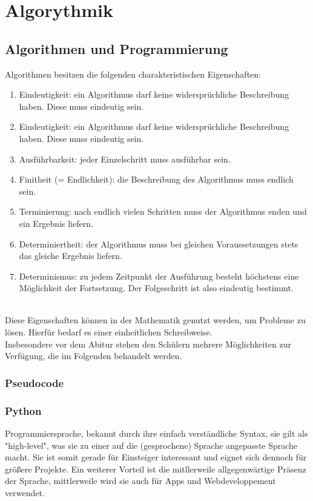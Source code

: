 \chapter{Algorythmik}
\section{Algorithmen und Programmierung}
\begin{Definition}
	Algorithmen besitzen die folgenden charakteristischen Eigenschaften:
	\begin{enumerate}
		\item Eindeutigkeit: ein Algorithmus darf keine widersprüchliche Beschreibung haben. Diese muss eindeutig sein.
		\item Eindeutigkeit: ein Algorithmus darf keine widersprüchliche Beschreibung haben. Diese muss eindeutig sein.
		\item Ausführbarkeit: jeder Einzelschritt muss ausführbar sein.
		\item Finitheit (= Endlichkeit): die Beschreibung des Algorithmus muss endlich sein.
		\item Terminierung: nach endlich vielen Schritten muss der Algorithmus enden und ein Ergebnis liefern.
		\item Determiniertheit: der Algorithmus muss bei gleichen Voraussetzungen stets das gleiche Ergebnis liefern.
		\item   Determinismus: zu jedem Zeitpunkt der Ausführung besteht höchstens eine Möglichkeit der Fortsetzung. Der Folgeschritt ist also eindeutig bestimmt.
	\end{enumerate}
\end{Definition}
\\
Diese Eigenschaften können in der Mathematik genutzt werden, um Probleme zu lösen. Hierfür bedarf es einer einheitlichen Schreibweise.\\
Insbesondere vor dem Abitur stehen den Schülern mehrere Möglichkeiten zur Verfügung, die im Folgenden behandelt werden.
\subsection{Pseudocode}
\subsection{Python}
Programmiersprache, bekannt durch ihre einfach verständliche Syntax, sie gilt als "high-level", was sie zu einer auf die (gesprochene) Sprache angepasste Sprache macht. Sie ist somit gerade für Einsteiger interessant und eignet sich dennoch für größere Projekte. Ein weiterer Vorteil ist die mitllerweile allgegenwärtige Präsenz der Sprache, mittlerweile wird sie auch für Apps und Webdeveloppement verwendet.
